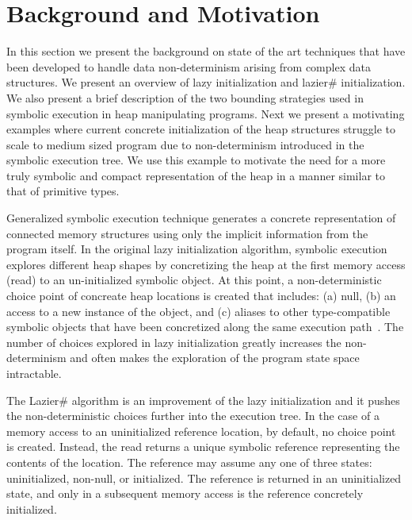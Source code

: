 \section{Background and Motivation}
\label{motivations}

In this section we present the background on state of the art
techniques that have been developed to handle data non-determinism
arising from complex data structures. We present an overview of lazy
initialization and lazier\# initialization. We also present a brief
description of the two bounding strategies used in symbolic execution
in heap manipulating programs. Next we present a motivating examples
where current concrete initialization of the heap structures struggle
to scale to medium sized program due to non-determinism introduced in
the symbolic execution tree. We use this example to motivate the need
for a more truly symbolic and compact representation of the heap in a
manner similar to that of primitive types.

Generalized symbolic execution technique generates a concrete
representation of connected memory structures using only the implicit
information from the program itself.  In the original lazy
initialization algorithm, symbolic execution explores different heap
shapes by concretizing the heap at the first memory access (read) to
an un-initialized symbolic object. At this point, a non-deterministic
choice point of concreate heap locations is created that includes: (a)
null, (b) an access to a new instance of the object, and (c) aliases
to other type-compatible symbolic objects that have been concretized
along the same execution path~\cite{GSE:TACAS2003}.  The number of
choices explored in lazy initialization greatly increases the
non-determinism and often makes the exploration of the program state
space intractable.

The Lazier\# algorithm is an improvement of the lazy initialization
and it pushes the non-deterministic choices further into the execution
tree. In the case of a memory access to an uninitialized reference
location, by default, no choice point is created. Instead, the read
returns a unique symbolic reference representing the contents of the
location. The reference may assume any one of three states:
uninitialized, non-null, or initialized. The reference is returned in
an uninitialized state, and only in a subsequent memory access is the
reference concretely initialized.
